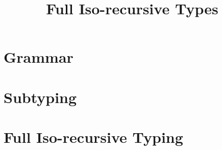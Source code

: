 \documentclass[a4paper]{article}
\title{Full Iso-recursive Types}
\begin{document}
\maketitle



\section{Grammar}

\ottgrammar


\section{Subtyping}

\ottdefnsAmberWellFormedEnv

\ottdefnsAmberWellFormedType

\ottdefnsAmberSubtyping

\ottdefnsACSubtyping


\section{Full Iso-recursive Typing}

\ottdefnsWellFormedTypeEnv

\ottdefnsWellFormedTermEnv
\end{document}
